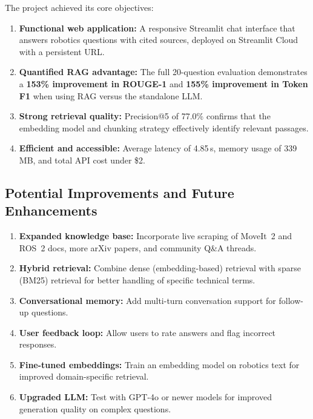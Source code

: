 \documentclass[12pt, a4paper]{article}
\begin{document}
The project achieved its core objectives:

\begin{enumerate}[nosep]
    \item \textbf{Functional web application:} A responsive Streamlit chat interface that answers robotics questions with cited sources, deployed on Streamlit Cloud with a persistent URL.
    \item \textbf{Quantified RAG advantage:} The full 20-question evaluation demonstrates a \textbf{153\% improvement in ROUGE-1} and \textbf{155\% improvement in Token F1} when using RAG versus the standalone LLM.
    \item \textbf{Strong retrieval quality:} Precision@5 of 77.0\% confirms that the embedding model and chunking strategy effectively identify relevant passages.
    \item \textbf{Efficient and accessible:} Average latency of 4.85\,s, memory usage of 339\,MB, and total API cost under \$2.
\end{enumerate}

\subsection{Potential Improvements and Future Enhancements}

\begin{enumerate}[nosep]
    \item \textbf{Expanded knowledge base:} Incorporate live scraping of MoveIt~2 and ROS~2 docs, more arXiv papers, and community Q\&A threads.
    \item \textbf{Hybrid retrieval:} Combine dense (embedding-based) retrieval with sparse (BM25) retrieval for better handling of specific technical terms.
    \item \textbf{Conversational memory:} Add multi-turn conversation support for follow-up questions.
    \item \textbf{User feedback loop:} Allow users to rate answers and flag incorrect responses.
    \item \textbf{Fine-tuned embeddings:} Train an embedding model on robotics text for improved domain-specific retrieval.
    \item \textbf{Upgraded LLM:} Test with GPT-4o or newer models for improved generation quality on complex questions.
\end{enumerate}
\end{document}
